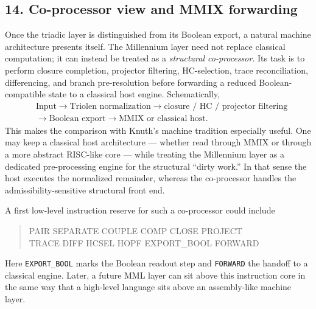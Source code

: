 \subsection*{14. Co-processor view and MMIX forwarding}
Once the triadic layer is distinguished from its Boolean export, a natural machine architecture presents itself. The Millennium layer need not replace classical computation; it can instead be treated as a \emph{structural co-processor}. Its task is to perform closure completion, projector filtering, HC-selection, trace reconciliation, differencing, and branch pre-resolution before forwarding a reduced Boolean-compatible state to a classical host engine. Schematically,
\[
\begin{aligned}
&\text{Input} \to \text{Triolen normalization} \to \text{closure / HC / projector filtering}\\
&\to \text{Boolean export} \to \text{MMIX or classical host}.
\end{aligned}
\]
This makes the comparison with Knuth's machine tradition especially useful. One may keep a classical host architecture --- whether read through MMIX or through a more abstract RISC-like core --- while treating the Millennium layer as a dedicated pre-processing engine for the structural ``dirty work.'' In that sense the host executes the normalized remainder, whereas the co-processor handles the admissibility-sensitive structural front end.

A first low-level instruction reserve for such a co-processor could include
\begin{quote}
\ttfamily
PAIR \quad SEPARATE \quad COUPLE \quad COMP \quad CLOSE \quad PROJECT \\
TRACE \quad DIFF \quad HCSEL \quad HOPF \quad EXPORT\_BOOL \quad FORWARD
\end{quote}
Here \texttt{EXPORT\_BOOL} marks the Boolean readout step and \texttt{FORWARD} the handoff to a classical engine. Later, a future MML layer can sit above this instruction core in the same way that a high-level language sits above an assembly-like machine layer.



